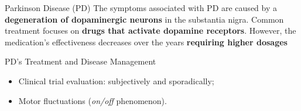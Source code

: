 \documentclass{beamer}
\begin{document}
%	
%
%


\begin{frame}{}  
  \begin{block}{Parkinson Disease (PD)}
The symptoms associated with PD are caused by a \textbf{degeneration of dopaminergic neurons} in the substantia nigra. Common treatment focuses on \textbf{drugs that activate dopamine receptors}. However, the medication's effectiveness decreases over the years \textbf{requiring higher dosages}
  \end{block} 
\end{frame}

\begin{frame}{} 
    \begin{block}{PD's Treatment and Disease Management}
      \begin{itemize}
					\item Clinical trial evaluation: subjectively and sporadically;
					\item Motor fluctuations (\textit{on/off} phenomenon).
     \end{itemize}
  \end{block}
\end{frame}
\end{document}
